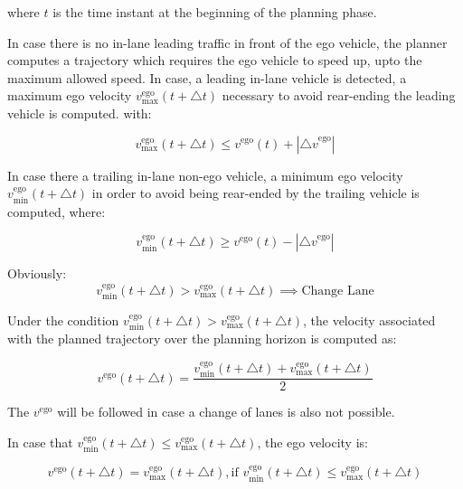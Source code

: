 \documentclass{article}
\begin{document}
where $ t $ is the time instant at the beginning of the planning phase.

In case there is no in-lane leading traffic in front of the ego vehicle, the planner computes a trajectory which requires the ego vehicle to speed up, upto the maximum allowed speed. In case, a leading in-lane vehicle is detected, a maximum ego velocity $ v^{\text{ego}}_{\text{max}}( t+\triangle t ) $ necessary to avoid rear-ending the leading vehicle is computed. with:

\begin{equation}
v^{\text{ego}}_{\text{max}}( t+\triangle t ) \leq v^{\text{ego}}(t) +  \left| {\triangle v}^{\text{ego}} \right|
\end{equation}


In case there a trailing in-lane non-ego vehicle, a minimum ego velocity $ v^{\text{ego}}_{\text{min}}( t+\triangle t ) $ in order to avoid being rear-ended by the trailing vehicle is computed, where:

\begin{equation}
v^{\text{ego}}_{\text{min}}( t+\triangle t ) \geq v^{\text{ego}}(t) -  \left| {\triangle v}^{\text{ego}} \right|
\end{equation}

Obviously:
\begin{equation}
v^{\text{ego}}_{\text{min}}( t+\triangle t ) > v^{\text{ego}}_{\text{max}}( t+\triangle t ) \implies \text{Change Lane}
\end{equation}


Under the condition $ v^{\text{ego}}_{\text{min}}( t+\triangle t ) > v^{\text{ego}}_{\text{max}}( t+\triangle t ) $, the velocity associated with the planned trajectory over the planning horizon is computed as:

\begin{equation}
v^{\text{ego}}( t+\triangle t ) = \frac{v^{\text{ego}}_{\text{min}}( t+\triangle t ) + v^{\text{ego}}_{\text{max}}( t+\triangle t )}{2}
\end{equation}



The $ v^{\text{ego}} $ will be followed in case a change of lanes is also not possible.

In case that $ v^{\text{ego}}_{\text{min}}( t+\triangle t ) \leq v^{\text{ego}}_{\text{max}}( t+\triangle t ) $, the ego velocity is:

\begin{equation}
v^{\text{ego}}( t+\triangle t ) =  v^{\text{ego}}_{\text{max}}( t+\triangle t ), \text{if }  v^{\text{ego}}_{\text{min}}( t+\triangle t ) \leq v^{\text{ego}}_{\text{max}}( t+\triangle t ) 
\end{equation}
\end{document}
